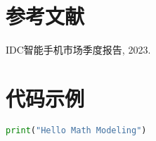 \documentclass[12pt,a4paper]{article}
\begin{document}
\section{参考文献}
\begin{thebibliography}{9}
 IDC智能手机市场季度报告, 2023.
\end{thebibliography}

\appendix
\section{代码示例}
\begin{lstlisting}[language=Python,caption=示例代码]
print("Hello Math Modeling")
\end{lstlisting}
\end{document}

